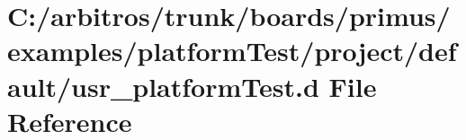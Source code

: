 \hypertarget{platform_test_2project_2default_2usr__platform_test_8d}{\section{C\-:/arbitros/trunk/boards/primus/examples/platform\-Test/project/default/usr\-\_\-platform\-Test.d File Reference}
\label{platform_test_2project_2default_2usr__platform_test_8d}
}
